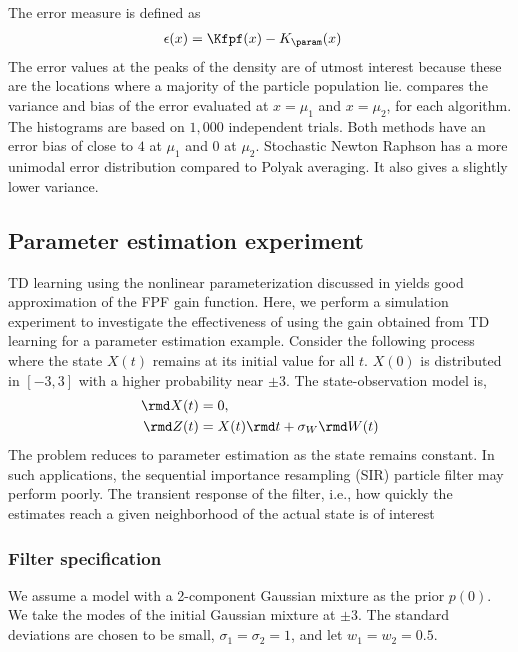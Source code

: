 The error measure is defined as
\begin{equation*}
\begin{aligned}
\epsilon(x) &= \Kfpf(x)-K_\param(x)
\end{aligned}
\end{equation*}
The error values at the peaks of the density are of utmost interest because these are the locations where a majority of the particle population lie.   compares the variance and bias of the error evaluated at $x=\mu_{1}$ and $x=\mu_{2}$, for each algorithm. The histograms are based on $1,000$ independent trials. Both methods have an error bias of close to $4$ at $\mu_{1}$ and $0$ at $\mu_{2}$. Stochastic Newton Raphson has a more unimodal error distribution compared to Polyak averaging. It also gives a slightly lower variance.




\subsection{Parameter estimation experiment}


TD learning using the nonlinear parameterization discussed in  yields good approximation of the FPF gain function. Here, we perform a simulation experiment to investigate the effectiveness of using the gain obtained from TD learning for a parameter estimation example. Consider the following process where the state $X(t)$ remains at its initial value for all $t$. $X(0)$ is distributed in $[-3,3]$ with a higher probability near $\pm3$. The state-observation model is,
\begin{equation*}
\begin{aligned}
\rmd X(t)&=0,\quad \\
\rmd Z(t)&= X(t) \rmd t+\sigma_{W}\rmd W(t)
\end{aligned}
\end{equation*}
The problem reduces to parameter estimation as the state remains constant. In such applications, the sequential importance resampling (SIR) particle filter may perform poorly. The transient response of the filter, i.e., how quickly the estimates reach a given neighborhood of the actual state is of interest
\subsubsection*{Filter specification}  We assume a model with a 2-component Gaussian mixture as the prior $p(0)$. We take the modes of the initial Gaussian mixture at $\pm 3$. The standard deviations are chosen to be small, $\sigma_{1}=\sigma_{2}=1$, and let $w_{1}=w_{2}=0.5$.

